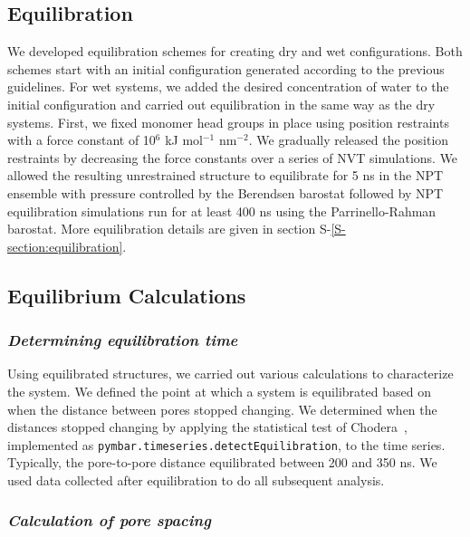 \documentclass[journal=jpcbfk,manuscript=article]{achemso}
\begin{document}
  \subsection{Equilibration}\label{section:equilibration}
  
  We developed equilibration schemes for creating dry and wet configurations.
  Both schemes start with an initial configuration generated according to the
  previous guidelines. For wet systems, we added the desired concentration of
  water to the initial configuration and carried out equilibration in the same
  way as the dry systems. First, we fixed monomer head groups in place using
  position restraints with a force constant of 10$^6$ kJ mol$^{-1}$ nm$^{-2}$. We
  gradually released the position restraints by decreasing the force constants
  over a series of NVT simulations. We allowed the resulting unrestrained
  structure to equilibrate for 5 ns in the NPT ensemble with pressure controlled
  by the Berendsen barostat followed by NPT equilibration simulations run for at
  least 400 ns using the Parrinello-Rahman barostat. More equilibration details
  are given in section S-\ref{S-section:equilibration}.

  \subsection{Equilibrium Calculations}

  \subsubsection{\textit{Determining equilibration time}}\label{method:equil_time}

  Using equilibrated structures, we carried out various calculations to
  characterize the system. We defined the point at which a system is equilibrated
  based on when the distance between pores stopped changing.  We determined when
  the distances stopped changing by applying the statistical test of Chodera~\cite{chodera_simple_2016},
  implemented as \texttt{pymbar.timeseries.detectEquilibration}, to the time series. Typically, the pore-to-pore
  distance equilibrated between 200 and 350 ns. We used data collected after 
  equilibration to do all subsequent analysis.

  \subsubsection{\textit{Calculation of pore spacing}}\label{method:pore_spacing}
\end{document}
